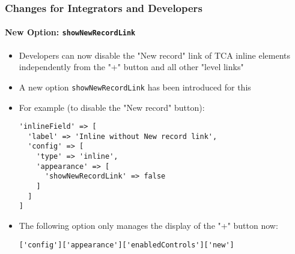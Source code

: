 %

\begin{frame}[fragile]
	\frametitle{Changes for Integrators and Developers}
	\framesubtitle{New Option: \texttt{showNewRecordLink}}


	\begin{itemize}
		\item Developers can now disable the "New record" link of TCA inline
			elements independently from the "+" button and all other "level links"
		\item A new option \texttt{showNewRecordLink} has been introduced for this
		\item For example (to disable the "New record" button):
\begin{lstlisting}
'inlineField' => [
  'label' => 'Inline without New record link',
  'config' => [
    'type' => 'inline',
    'appearance' => [
      'showNewRecordLink' => false
    ]
  ]
]
\end{lstlisting}

		\item The following option only manages the display of the "+" button now:
\begin{lstlisting}
['config']['appearance']['enabledControls']['new']
\end{lstlisting}

	\end{itemize}

\end{frame}

